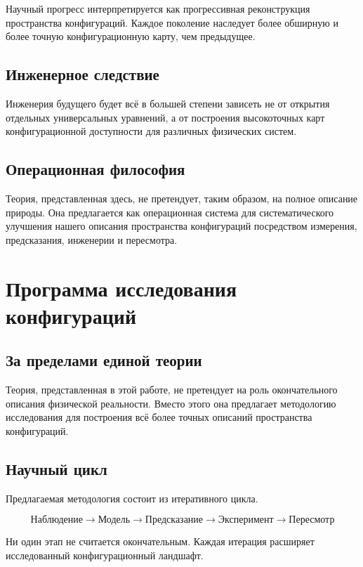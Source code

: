 Научный прогресс интерпретируется как прогрессивная реконструкция пространства конфигураций. Каждое поколение наследует более обширную и более точную конфигурационную карту, чем предыдущее.

\section{Инженерное следствие}

Инженерия будущего будет всё в большей степени зависеть не от открытия отдельных универсальных уравнений, а от построения высокоточных карт конфигурационной доступности для различных физических систем.

\section{Операционная философия}

Теория, представленная здесь, не претендует, таким образом, на полное описание природы. Она предлагается как операционная система для систематического улучшения нашего описания пространства конфигураций посредством измерения, предсказания, инженерии и пересмотра.

\chapter{Программа исследования конфигураций}

\section{За пределами единой теории}

Теория, представленная в этой работе, не претендует на роль окончательного описания физической реальности. Вместо этого она предлагает методологию исследования для построения всё более точных описаний пространства конфигураций.

\section{Научный цикл}

Предлагаемая методология состоит из итеративного цикла.

\[ \boxed{ \text{Наблюдение} \rightarrow \text{Модель} \rightarrow \text{Предсказание} \rightarrow \text{Эксперимент} \rightarrow \text{Пересмотр} } \]

Ни один этап не считается окончательным. Каждая итерация расширяет исследованный конфигурационный ландшафт.

